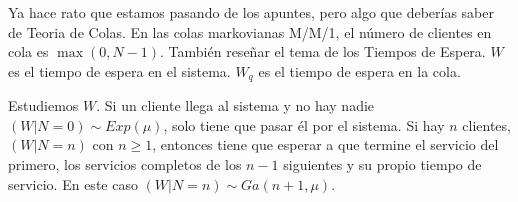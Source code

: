 \documentclass[PREyA.tex]{subfiles}
\begin{document}
Ya hace rato que estamos pasando de los apuntes, pero algo que deberías saber de Teoria de Colas. En las colas markovianas M/M/1, el número de clientes en cola es $\max(0,N-1)$. También reseñar el tema de los Tiempos de Espera. $W$ es el tiempo de espera en el sistema. $W_q$ es el tiempo de espera en la cola.

Estudiemos $W$. Si un cliente llega al sistema y no hay nadie $(W|N=0)\sim Exp(\mu)$, solo tiene que pasar él por el sistema. Si hay $n$ clientes, $(W|N=n)$ con $n\geq 1$, entonces tiene que esperar a que termine el servicio del primero, los servicios completos de los $n-1$ siguientes y su propio tiempo de servicio. En este caso $(W|N=n)\sim Ga(n+1,\mu)$.
\end{document}
